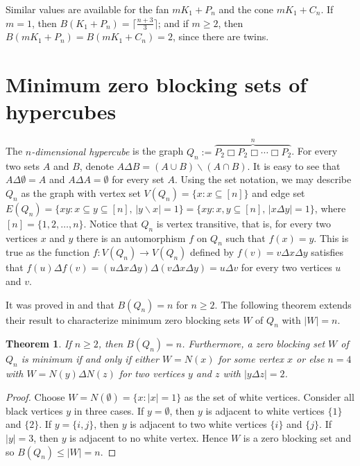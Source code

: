 \documentclass[preprint,12pt]{elsarticle}
\newtheorem{theorem}{Theorem}
\begin{document}
{Similar values are available for the fan $mK_1+P_n$ and the cone $mK_1+C_n$.
If $m=1$, then $B(K_1+P_n)=\lceil\frac{n+3}{3}\rceil$;
and if $m\ge 2$, then $B(mK_1+P_n)=B(mK_1+C_n)=2$, since there are twins.

\section{Minimum zero blocking sets of hypercubes}  \label{sec-cube}

The {\em $n$-dimensional hypercube} is the graph $Q_n:=\overbrace{P_2\Box P_2\Box\cdots\Box P_2}^n$.
For every two sets $A$ and $B$,
denote $A \Delta B = (A\cup B)\backslash (A \cap B)$.
It is easy to see that $A\Delta\emptyset=A$ and $A\Delta A=\emptyset$ for every set $A$.
Using the set notation, we may describe $Q_n$ as the graph with
vertex set $V(Q_n)=\{x: x\subseteq [n]\}$ and
edge set $E(Q_n) =\{xy: x\subseteq y \subseteq [n],\, |y\backslash x|=1\}
=\{xy: x,y\subseteq [n],\, |x\Delta y|=1\}$,
where $[n]=\{1,2,\ldots,n\}$.
Notice that $Q_n$ is vertex transitive, that is, for every two vertices $x$ and $y$ there is an automorphism $f$ on $Q_n$ such that $f(x)=y$.
This is true as the function $f:V(Q_n)\to V(Q_n)$ defined by $f(v)=v\Delta x\Delta y$
satisfies that $f(u)\Delta f(v)=(u\Delta x\Delta y)\Delta(v\Delta x\Delta y)=u\Delta v$ for every two vertices $u$ and $v$.

It was proved in \cite{2024agm} and \cite{2024c} that $B(Q_n)=n$ for $n\ge 2$.
The following theorem extends their result to characterize minimum zero blocking sets $W$ of $Q_n$ with $|W|=n$.


\begin{theorem}
If $n\geq 2$, then $B(Q_n)=n$.
Furthermore, a zero blocking set $W$ of $Q_n$ is minimum
if and only if either $W=N(x)$ for some vertex $x$
or else $n=4$ with $W=N(y)\Delta N(z)$ for two vertices $y$ and $z$ with $|y\Delta z|=2$.
\end{theorem}
\begin{proof}
Choose $W=N(\emptyset)=\{x: |x|=1\}$ as the set of white vertices.
Consider all black vertices $y$ in three cases.
If $y=\emptyset$, then $y$ is adjacent to white vertices $\{1\}$ and $\{2\}$.
If $y=\{i,j\}$, then $y$ is adjacent to two white vertices $\{i\}$ and $\{j\}$.
If $|y|=3$, then $y$ is adjacent to no white vertex.
Hence $W$ is a zero blocking set and so $B(Q_n)\le |W|=n$.


\end{proof}}
\end{document}
